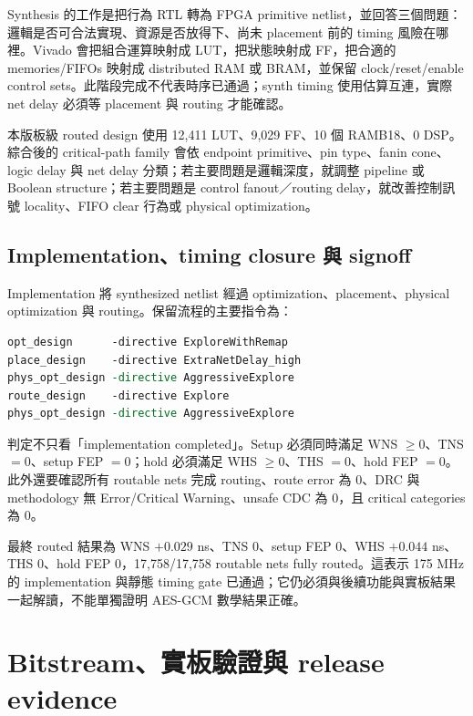 \documentclass[UTF8,fontset=none,11pt,a4paper]{ctexrep}
\newcommand{\code}[1]{\texttt{\detokenize{#1}}}
\begin{document}
Synthesis 的工作是把行為 RTL 轉為 FPGA primitive netlist，並回答三個問題：邏輯是否可合法實現、資源是否放得下、尚未 placement 前的 timing 風險在哪裡。Vivado 會把組合運算映射成 LUT，把狀態映射成 FF，把合適的 memories/FIFOs 映射成 distributed RAM 或 BRAM，並保留 clock/reset/enable control sets。此階段完成不代表時序已通過；synth timing 使用估算互連，實際 net delay 必須等 placement 與 routing 才能確認。

本版板級 routed design 使用 12,411 LUT、9,029 FF、10 個 RAMB18、0 DSP。綜合後的 critical-path family 會依 endpoint primitive、pin type、fanin cone、logic delay 與 net delay 分類；若主要問題是邏輯深度，就調整 pipeline 或 Boolean structure；若主要問題是 control fanout／routing delay，就改善控制訊號 locality、FIFO clear 行為或 physical optimization。

\subsection{Implementation、timing closure 與 signoff}

Implementation 將 synthesized netlist 經過 optimization、placement、physical optimization 與 routing。保留流程的主要指令為：

\begin{lstlisting}[language=tcl,caption={175 MHz implementation 主流程}]
opt_design      -directive ExploreWithRemap
place_design    -directive ExtraNetDelay_high
phys_opt_design -directive AggressiveExplore
route_design    -directive Explore
phys_opt_design -directive AggressiveExplore
\end{lstlisting}

判定不只看「implementation completed」。Setup 必須同時滿足 WNS $\ge 0$、TNS $=0$、setup FEP $=0$；hold 必須滿足 WHS $\ge 0$、THS $=0$、hold FEP $=0$。此外還要確認所有 routable nets 完成 routing、route error 為 0、DRC 與 methodology 無 Error/Critical Warning、unsafe CDC 為 0，且 \code{check\_timing} critical categories 為 0。

最終 routed 結果為 WNS $+0.029$ ns、TNS 0、setup FEP 0、WHS $+0.044$ ns、THS 0、hold FEP 0，17,758/17,758 routable nets fully routed。這表示 175 MHz 的 implementation 與靜態 timing gate 已通過；它仍必須與後續功能與實板結果一起解讀，不能單獨證明 AES-GCM 數學結果正確。

\section{Bitstream、實板驗證與 release evidence}
\end{document}
